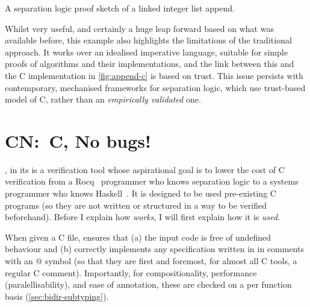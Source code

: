 \begin{marginfigure}
    \inputminted[breaklines,mathescape,fontsize=\small]{py}{code/append_annot.py}
    \caption{A separation logic proof sketch of a linked integer list
        append.}\label{fig:append-annot}
\end{marginfigure}

Whilst very useful, and certainly a huge leap forward based on what was
available before, this example also highlights the limitations of the
traditional approach. It works over an idealised imperative language, suitable
for simple proofs of algorithms and their implementations, and the link between
this and the C implementation in \cref{fig:append-c} is based on trust. This
issue persists with contemporary, mechanised frameworks for separation
logic,
which use trust-based model of C, rather than an \emph{empirically validated}
one.

\section{CN:\ C, No bugs!}\label{sec:cn-intro}

, in its  is a verification tool whose aspirational goal is to lower the cost of
C verification from a Rocq~ programmer who knows separation
logic to a systems programmer who knows
Haskell~. It is designed to be used pre-existing C programs (so they are
not written or structured in a way to be verified beforehand). Before I explain
how \emph{works}, I will first explain how it is \emph{used}.

When given a C file,  ensures that (a) the input code is free of
undefined behaviour and (b) correctly implements any specification written in
 in comments with an @ symbol 
(so that they are first and foremost, for almost all C tools, a regular C
comment). Importantly, for compositionality, performance (paralellisability),
and ease of annotation, these are checked on a per function basis (\cref{sec:bidir-subtyping}).

